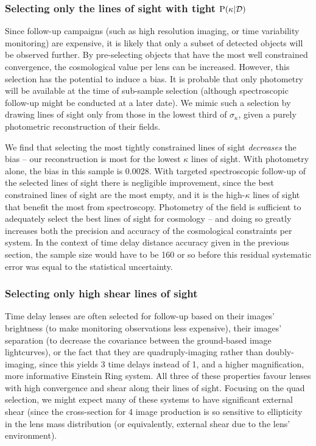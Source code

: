 \documentclass[useAMS,usenatbib]{mn2e}
\begin{document}
\subsubsection{Selecting only the lines of sight with tight ${\rm P}(\kappa|{\mathcal{D}})$}
\label{sec:bias:tightPDF}

Since follow-up campaigns (such as high resolution imaging, or time
variability monitoring) are expensive, it is likely that only a subset of
detected objects will be observed further. By pre-selecting objects that have 
the most well constrained convergence, the cosmological value per lens can be
increased. However, this selection has the potential to induce a bias. It is
probable that only photometry will be available at the time of sub-sample
selection (although spectroscopic follow-up might be conducted at a later
date). We mimic such a selection by drawing lines of sight only from those in
the lowest third of $\sigma_{\kappa}$, given a purely photometric
reconstruction of their fields. 

We find that selecting the most tightly constrained lines of sight {\it
decreases} the bias -- our reconstruction is most \succesful for the lowest
$\kappa$ lines of sight. With photometry alone, the bias in this sample is
0.0028. With targeted spectroscopic follow-up of the selected lines of sight
there is negligible improvement, since the best constrained lines of sight are
the most empty, and it is the high-$\kappa$ lines of sight that benefit the
most from spectroscopy. Photometry of the field is sufficient to adequately
select the best lines of sight for cosmology -- and doing so greatly increases
both the precision and accuracy of the cosmological constraints per system.
In the context of time delay distance accuracy given in the previous section,
the sample size would have to be 160 or so before this residual systematic
error was equal to the statistical uncertainty.


\subsubsection{Selecting only high shear lines of sight}
\label{sec:bias:tightPDF}

Time delay lenses are often selected for follow-up based on their images'
brightness (to make monitoring observations less expensive), their images'
separation (to decrease the covariance between the ground-based image
lightcurves), or the fact that they are quadruply-imaging rather than
doubly-imaging, since this yields 3 time delays instead of 1, and a higher
magnification, more informative Einstein Ring system. All three of these
properties favour lenses with high convergence and shear along their lines of
sight. Focusing on the quad selection, we might expect many of these systems
to have significant external shear (since the cross-section for 4 image
production is so sensitive to ellipticity in the lens mass distribution (or
equivalently, external shear due to the lens' environment). 
\end{document}
